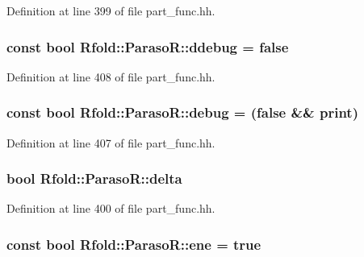 Definition at line 399 of file part\+\_\+func.\+hh.

\hypertarget{class_rfold_1_1_paraso_r_ae9b7970e1a048776c3ae5ca788f7d760}{
\subsubsection[{ddebug}]{\setlength{\rightskip}{0pt plus 5cm}const bool Rfold\+::\+Paraso\+R\+::ddebug = false\hspace{0.3cm}{\ttfamily [static]}}}\label{class_rfold_1_1_paraso_r_ae9b7970e1a048776c3ae5ca788f7d760}


Definition at line 408 of file part\+\_\+func.\+hh.

\hypertarget{class_rfold_1_1_paraso_r_a2858329db34fcaaa334abbfcea96c01d}{
\subsubsection[{debug}]{\setlength{\rightskip}{0pt plus 5cm}const bool Rfold\+::\+Paraso\+R\+::debug = (false \&\& {\bf print})\hspace{0.3cm}{\ttfamily [static]}}}\label{class_rfold_1_1_paraso_r_a2858329db34fcaaa334abbfcea96c01d}


Definition at line 407 of file part\+\_\+func.\+hh.

\hypertarget{class_rfold_1_1_paraso_r_ac0a808250ee05c1f56b5be32d867f11e}{
\subsubsection[{delta}]{\setlength{\rightskip}{0pt plus 5cm}bool Rfold\+::\+Paraso\+R\+::delta}}\label{class_rfold_1_1_paraso_r_ac0a808250ee05c1f56b5be32d867f11e}


Definition at line 400 of file part\+\_\+func.\+hh.

\hypertarget{class_rfold_1_1_paraso_r_a6e98b41eab558c42df86f5ff7469e7cc}{
\subsubsection[{ene}]{\setlength{\rightskip}{0pt plus 5cm}const bool Rfold\+::\+Paraso\+R\+::ene = true\hspace{0.3cm}{\ttfamily [static]}}}\label{class_rfold_1_1_paraso_r_a6e98b41eab558c42df86f5ff7469e7cc}



